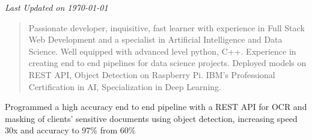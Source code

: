 \documentclass[8pt,a4paper,ragged2e,withhyper]{altacv}
\begin{document}
\begin{paracol}{2}
        \vspace*{\fill}
        \scriptsize\textit{Last Updated on \today}
        
        
        
        \newpage
        
        \switchcolumn
        
            \begin{quote}
                Passionate developer, inquisitive, fast learner with experience in Full Stack Web Development and a specialist in Artificial Intelligence and Data Science. Well equipped with advanced level python, C++. Experience in creating end to end pipelines for data science projects. Deployed models on REST API, Object Detection on Raspberry Pi. IBM's Professional Certification in AI, Specialization in Deep Learning. 
            \end{quote}
        
            
            Programmed a high accuracy end to end pipeline with a REST API for OCR and masking of clients' sensitive documents using object detection, increasing speed 30x and accuracy to 97\% from 60\%


\end{paracol}
\end{document}
